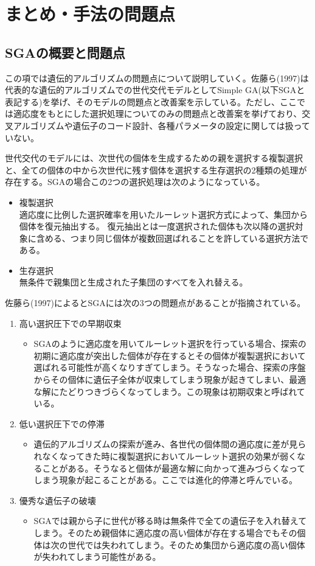 \section{まとめ・手法の問題点
}
\subsection{SGAの概要と問題点}
この項では遺伝的アルゴリズムの問題点について説明していく。佐藤ら(1997)は代表的な遺伝的アルゴリズムでの世代交代モデルとしてSimple GA(以下SGAと表記する)を挙げ、そのモデルの問題点と改善案を示している。ただし、ここでは適応度をもとにした選択処理についてのみの問題点と改善案を挙げており、交叉アルゴリズムや遺伝子のコード設計、各種パラメータの設定に関しては扱っていない。

世代交代のモデルには、次世代の個体を生成するための親を選択する複製選択と、全ての個体の中から次世代に残す個体を選択する生存選択の2種類の処理が存在する。SGAの場合この2つの選択処理は次のようになっている。

\begin{itemize}
\item{複製選択}\\
適応度に比例した選択確率を用いたルーレット選択方式によって、集団から個体を復元抽出する。
復元抽出とは一度選択された個体も次以降の選択対象に含める、つまり同じ個体が複数回選ばれることを許している選択方法である。
\item{生存選択}\\
無条件で親集団と生成された子集団のすべてを入れ替える。
\end{itemize}

佐藤ら(1997)によるとSGAには次の3つの問題点があることが指摘されている。
\begin{enumerate}
\item{高い選択圧下での早期収束}
\begin{itemize}
\item{SGAのように適応度を用いてルーレット選択を行っている場合、探索の初期に適応度が突出した個体が存在するとその個体が複製選択において選ばれる可能性が高くなりすぎてしまう。そうなった場合、探索の序盤からその個体に遺伝子全体が収束してしまう現象が起きてしまい、最適な解にたどりつきづらくなってしまう。この現象は初期収束と呼ばれている。}
\end{itemize}
\item{低い選択圧下での停滞}
\begin{itemize}
\item{遺伝的アルゴリズムの探索が進み、各世代の個体間の適応度に差が見られなくなってきた時に複製選択においてルーレット選択の効果が弱くなることがある。そうなると個体が最適な解に向かって進みづらくなってしまう現象が起こることがある。ここでは進化的停滞と呼んでいる。}
\end{itemize}
\item{優秀な遺伝子の破壊}
\begin{itemize}
\item{SGAでは親から子に世代が移る時は無条件で全ての遺伝子を入れ替えてしまう。そのため親個体に適応度の高い個体が存在する場合でもその個体は次の世代では失われてしまう。そのため集団から適応度の高い個体が失われてしまう可能性がある。}
\end{itemize}
\end{enumerate}

